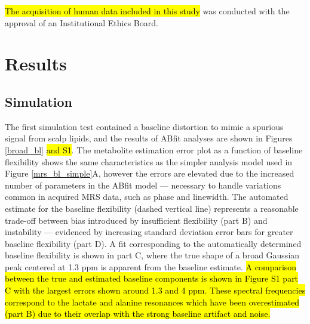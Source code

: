 \documentclass[num-refs]{wiley-article}
\newcommand{\revone}[2]{\hl{#1}\marginnote{\hl{#2}}}
\newcommand{\revonenm}[1]{\hl{#1}} %
\begin{document}
\revonenm{The acquisition of human data included in this study} was conducted with the approval of an Institutional Ethics Board.

\section{Results}
\subsection{Simulation}
The first simulation test contained a baseline distortion to mimic a spurious signal from scalp lipids, and the results of ABfit analyses are shown in Figures \ref{broad_bl} \revone{and S1}{R1.2}. The metabolite estimation error plot as a function of baseline flexibility shows the same characteristics as the simpler analysis model used in Figure \ref{mrs_bl_simple}A, however the errors are elevated due to the increased number of parameters in the ABfit model --- necessary to handle variations common in acquired MRS data, such as phase and linewidth. The automated estimate for the baseline flexibility (dashed vertical line) represents a reasonable trade-off between bias introduced by insufficient flexibility (part B) and instability --- evidenced by increasing standard deviation error bars for greater baseline flexibility (part D). A fit corresponding to the automatically determined baseline flexibility is shown in part C, where the true shape of a broad Gaussian peak centered at 1.3 ppm is apparent from the baseline estimate. \revone{A comparison between the true and estimated baseline components is shown in Figure S1 part C with the largest errors shown around 1.3 and 4 ppm. These spectral frequencies correspond to the lactate and alanine resonances which have been overestimated (part B) due to their overlap with the strong baseline artifact and noise.}{R1.2}
\end{document}
